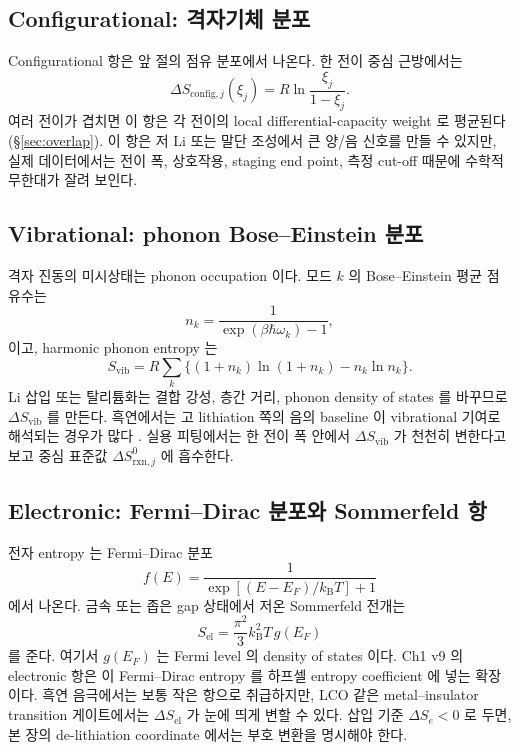 \documentclass[11pt,a4paper]{article}
\newcommand{\rxn}{\mathrm{rxn}}
\newcommand{\config}{\mathrm{config}}
\newcommand{\vib}{\mathrm{vib}}
\newcommand{\el}{\mathrm{el}}
\begin{document}
\subsection{Configurational: 격자기체 분포}
Configurational 항은 앞 절의 점유 분포에서 나온다. 한 전이 중심 근방에서는
\begin{equation}
\Delta S_{\config,j}(\xi_j)=R\ln\frac{\xi_j}{1-\xi_j}.
\label{eq:config_j}
\end{equation}
여러 전이가 겹치면 이 항은 각 전이의 local differential-capacity weight 로 평균된다
(\S\ref{sec:overlap}). 이 항은 저 Li 또는 말단 조성에서 큰 양/음 신호를 만들 수 있지만, 실제 데이터에서는
전이 폭, 상호작용, staging end point, 측정 cut-off 때문에 수학적 무한대가 잘려 보인다.

\subsection{Vibrational: phonon Bose--Einstein 분포}
격자 진동의 미시상태는 phonon occupation 이다. 모드 $k$ 의 Bose--Einstein 평균 점유수는
\begin{equation}
n_k=\frac{1}{\exp(\beta\hbar\omega_k)-1},
\label{eq:be}
\end{equation}
이고, harmonic phonon entropy 는
\begin{equation}
S_{\vib}
=R\sum_k\{(1+n_k)\ln(1+n_k)-n_k\ln n_k\}.
\label{eq:svib}
\end{equation}
Li 삽입 또는 탈리튬화는 결합 강성, 층간 거리, phonon density of states 를 바꾸므로
$\Delta S_{\vib}$ 를 만든다. 흑연에서는 고 lithiation 쪽의 음의 baseline 이 vibrational 기여로 해석되는
경우가 많다 \cite{reynier2003,allart2018,jpcc2021}. 실용 피팅에서는 한 전이 폭 안에서
$\Delta S_{\vib}$ 가 천천히 변한다고 보고 중심 표준값 $\Delta S_{\rxn,j}^0$ 에 흡수한다.

\subsection{Electronic: Fermi--Dirac 분포와 Sommerfeld 항}
전자 entropy 는 Fermi--Dirac 분포
\begin{equation}
f(E)=\frac{1}{\exp[(E-E_F)/k_{\mathrm B}T]+1}
\label{eq:fd}
\end{equation}
에서 나온다. 금속 또는 좁은 gap 상태에서 저온 Sommerfeld 전개는
\begin{equation}
S_{\el}=\frac{\pi^2}{3}k_{\mathrm B}^2T\,g(E_F)
\label{eq:sommerfeld}
\end{equation}
를 준다. 여기서 $g(E_F)$ 는 Fermi level 의 density of states 이다. Ch1 v9 의 electronic 항은 이
Fermi--Dirac entropy 를 하프셀 entropy coefficient 에 넣는 확장이다. 흑연 음극에서는 보통 작은 항으로
취급하지만, LCO 같은 metal--insulator transition 게이트에서는 $\Delta S_{\el}$ 가 눈에 띄게 변할 수 있다.
삽입 기준 $\Delta S_e<0$ 로 두면, 본 장의 de-lithiation coordinate 에서는 부호 변환을 명시해야 한다.
\end{document}
